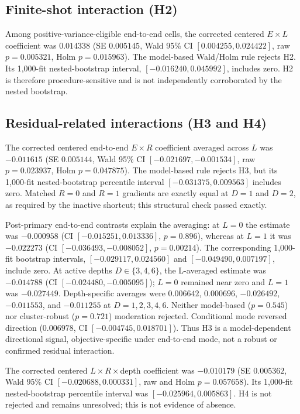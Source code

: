 \documentclass[pdflatex,sn-mathphys-num,Numbered]{sn-jnl}
\begin{document}
\subsection{Finite-shot interaction (H2)}\label{sec:h2-result}

Among positive-variance-eligible end-to-end cells, the corrected centered $E\times L$ coefficient was $0.014338$ (SE $0.005145$, Wald 95\% CI $[0.004255,0.024422]$, raw $p=0.005321$, Holm $p=0.015963$). The model-based Wald/Holm rule rejects H2. Its 1,000-fit nested-bootstrap interval, $[-0.016240,0.045992]$, includes zero. H2 is therefore procedure-sensitive and is not independently corroborated by the nested bootstrap.

\subsection{Residual-related interactions (H3 and H4)}\label{sec:residual-results}

The corrected centered end-to-end $E\times R$ coefficient averaged across $L$ was $-0.011615$ (SE $0.005144$, Wald 95\% CI $[-0.021697,-0.001534]$, raw $p=0.023937$, Holm $p=0.047875$). The model-based rule rejects H3, but its 1,000-fit nested-bootstrap percentile interval $[-0.031375,0.009563]$ includes zero. Matched $R=0$ and $R=1$ gradients are exactly equal at $D=1$ and $D=2$, as required by the inactive shortcut; this structural check passed exactly.

Post-primary end-to-end contrasts explain the averaging: at $L=0$ the estimate was $-0.000958$ (CI $[-0.015251,0.013336]$, $p=0.896$), whereas at $L=1$ it was $-0.022273$ (CI $[-0.036493,-0.008052]$, $p=0.00214$). The corresponding 1,000-fit bootstrap intervals, $[-0.029117,0.024560]$ and $[-0.049490,0.007197]$, include zero. At active depths $D\in\{3,4,6\}$, the L-averaged estimate was $-0.014788$ (CI $[-0.024480,-0.005095]$); $L=0$ remained near zero and $L=1$ was $-0.027449$. Depth-specific averages were $0.006642$, $0.000696$, $-0.026492$, $-0.011553$, and $-0.011255$ at $D=1,2,3,4,6$. Neither model-based ($p=0.545$) nor cluster-robust ($p=0.721$) moderation rejected. Conditional mode reversed direction ($0.006978$, CI $[-0.004745,0.018701]$). Thus H3 is a model-dependent directional signal, objective-specific under end-to-end mode, not a robust or confirmed residual interaction.

The corrected centered $L\times R\times$depth coefficient was $-0.010179$ (SE $0.005362$, Wald 95\% CI $[-0.020688,0.000331]$, raw and Holm $p=0.057658$). Its 1,000-fit nested-bootstrap percentile interval was $[-0.025964,0.005863]$. H4 is not rejected and remains unresolved; this is not evidence of absence.
\end{document}
